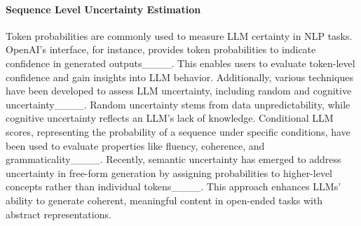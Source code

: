 \paragraph{Sequence Level Uncertainty Estimation}


Token probabilities are commonly used to measure LLM certainty in NLP tasks. OpenAI’s interface, for instance, provides token probabilities to indicate confidence in generated outputs____. This enables users to evaluate token-level confidence and gain insights into LLM behavior. Additionally, various techniques have been developed to assess LLM uncertainty, including random and cognitive uncertainty____. Random uncertainty stems from data unpredictability, while cognitive uncertainty reflects an LLM’s lack of knowledge. Conditional LLM scores, representing the probability of a sequence under specific conditions, have been used to evaluate properties like fluency, coherence, and grammaticality____. Recently, semantic uncertainty has emerged to address uncertainty in free-form generation by assigning probabilities to higher-level concepts rather than individual tokens____. This approach enhances LLMs' ability to generate coherent, meaningful content in open-ended tasks with abstract representations.


